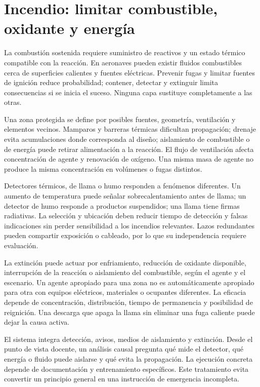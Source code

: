 \section{Incendio: limitar combustible, oxidante y energía}
La combustión sostenida requiere suministro de reactivos y un estado térmico compatible con la reacción. En aeronaves pueden existir fluidos combustibles cerca de superficies calientes y fuentes eléctricas. Prevenir fugas y limitar fuentes de ignición reduce probabilidad; contener, detectar y extinguir limita consecuencias si se inicia el suceso. Ninguna capa sustituye completamente a las otras.

Una zona protegida se define por posibles fuentes, geometría, ventilación y elementos vecinos. Mamparos y barreras térmicas dificultan propagación; drenaje evita acumulaciones donde corresponda al diseño; aislamiento de combustible o de energía puede retirar alimentación a la reacción. El flujo de ventilación afecta concentración de agente y renovación de oxígeno. Una misma masa de agente no produce la misma concentración en volúmenes o fugas distintos.

Detectores térmicos, de llama o humo responden a fenómenos diferentes. Un aumento de temperatura puede señalar sobrecalentamiento antes de llama; un detector de humo responde a productos suspendidos; una llama tiene firmas radiativas. La selección y ubicación deben reducir tiempo de detección y falsas indicaciones sin perder sensibilidad a los incendios relevantes. Lazos redundantes pueden compartir exposición o cableado, por lo que su independencia requiere evaluación.

La extinción puede actuar por enfriamiento, reducción de oxidante disponible, interrupción de la reacción o aislamiento del combustible, según el agente y el escenario. Un agente apropiado para una zona no es automáticamente apropiado para otra con equipos eléctricos, materiales o ocupantes diferentes. La eficacia depende de concentración, distribución, tiempo de permanencia y posibilidad de reignición. Una descarga que apaga la llama sin eliminar una fuga caliente puede dejar la causa activa.

El sistema integra detección, avisos, medios de aislamiento y extinción. Desde el punto de vista docente, un análisis causal pregunta qué mide el detector, qué energía o fluido puede aislarse y qué evita la propagación. La ejecución concreta depende de documentación y entrenamiento específicos. Este tratamiento evita convertir un principio general en una instrucción de emergencia incompleta.

